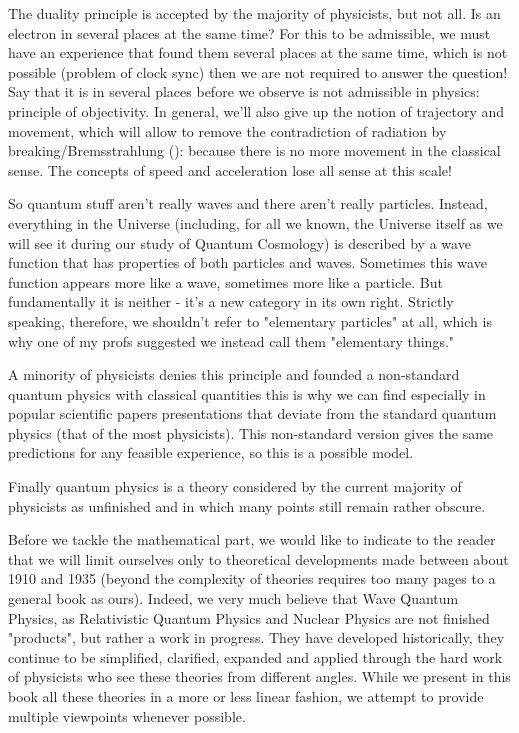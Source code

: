 	The duality principle is accepted by the majority of physicists, but not all. Is an electron in several places at the same time? For this to be admissible, we must have an experience that found them several places at the same time, which is not possible (problem of clock sync) then we are not required to answer the question! Say that it is in several places before we observe is not admissible in physics: principle of objectivity. In general, we'll also give up the notion of trajectory and movement, which will allow to remove the contradiction of radiation by breaking/Bremsstrahlung (): because there is no more movement in the classical sense. The concepts of speed and acceleration lose all sense at this scale!
	
	\begin{tcolorbox}[title=Remark,colframe=black,arc=10pt]
	So quantum stuff aren't really waves and there aren't really particles. Instead, everything in the Universe (including, for all we known, the Universe itself as we will see it during our study of Quantum Cosmology) is described by a wave function that has properties of both particles and waves. Sometimes this wave function appears more like a wave, sometimes more like a particle. But fundamentally it is neither - it's a new category in its own right. Strictly speaking, therefore, we shouldn't refer to "elementary particles" at all, which is why one of my profs suggested we instead call them "elementary things."
	\end{tcolorbox}
	
	A minority of physicists denies this principle and founded a non-standard quantum physics with classical quantities this is why we can find especially in popular scientific papers presentations that deviate from the standard quantum physics (that of the most physicists). This non-standard version gives the same predictions for any feasible experience, so this is a possible model.
	
	Finally quantum physics is a theory considered by the current majority of physicists as unfinished and in which many points still remain rather obscure.
	
	Before we tackle the mathematical part, we would like to indicate to the reader that we will limit ourselves only to theoretical developments made between about 1910 and 1935 (beyond the complexity of theories requires too many pages to a general book as ours). Indeed, we very much believe that Wave Quantum Physics, as Relativistic Quantum Physics and Nuclear Physics are not finished "products", but rather a work in progress. They have developed historically, they continue to be simplified, clarified, expanded and applied through the hard work of physicists who see these theories from different angles. While we present in this book all these theories in a more or less linear fashion, we attempt to provide multiple viewpoints whenever possible.
	

